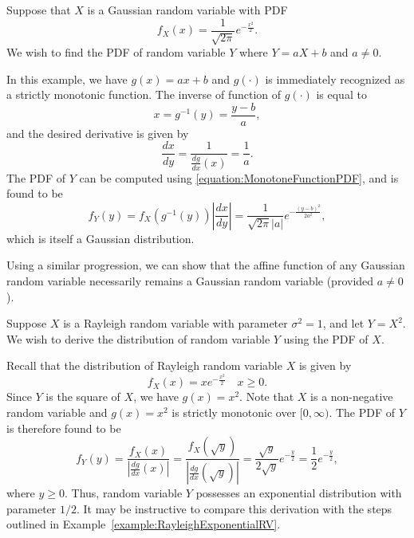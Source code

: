 \begin{example}
Suppose that $X$ is a Gaussian random variable with PDF
\begin{equation*}
f_X(x) = \frac{1}{\sqrt{2 \pi}} e^{- \frac{x^2}{2}} .
\end{equation*}
We wish to find the PDF of random variable $Y$ where $Y = a X + b$ and $a \neq 0$.

In this example, we have $g(x) = ax + b$ and $g(\cdot)$ is immediately recognized as a strictly monotonic function.
The inverse of function of $g(\cdot)$ is equal to
\begin{equation*}
x = g^{-1} (y) = \frac{y - b}{a} ,
\end{equation*}
and the desired derivative is given by
\begin{equation*}
\frac{dx}{dy} = \frac{1}{\frac{dg}{dx} (x)} = \frac{1}{a} .
\end{equation*}
The PDF of $Y$ can be computed using \eqref{equation:MonotoneFunctionPDF}, and is found to be
\begin{equation*}
f_Y(y) = f_X \left( g^{-1} (y) \right) \left| \frac{dx}{dy} \right|
= \frac{1}{\sqrt{2 \pi} |a|} e^{- \frac{(y-b)^2}{2 a^2} } ,
\end{equation*}
which is itself a Gaussian distribution.
\end{example}

Using a similar progression, we can show that the affine function of any Gaussian random variable necessarily remains a Gaussian random variable (provided $a \neq 0$).

\begin{example}
Suppose $X$ is a Rayleigh random variable with parameter $\sigma^2 = 1$, and let $Y = X^2$.
We wish to derive the distribution of random variable $Y$ using the PDF of $X$.

Recall that the distribution of Rayleigh random variable $X$ is given by
\begin{equation*}
f_X (x) = x e^{- \frac{x^2}{2} } \quad x \geq 0.
\end{equation*}
Since $Y$ is the square of $X$, we have $g(x) = x^2$.
Note that $X$ is a non-negative random variable and $g(x) = x^2$ is strictly monotonic over $[0, \infty)$.
The PDF of $Y$ is therefore found to be
\begin{equation*}
f_Y(y) = \frac{f_X (x)}{\left| \frac{dg}{dx}(x)\right|}
= \frac{f_X \left( \sqrt{y} \right)}{\left| \frac{dg}{dx} \left( \sqrt{y} \right) \right|}
= \frac{\sqrt{y}}{2 \sqrt{y}} e^{- \frac{y}{2} }
= \frac{1}{2} e^{- \frac{y}{2} } ,
\end{equation*}
where $y \geq 0$.
Thus, random variable $Y$ possesses an exponential distribution with parameter $1 / 2$.
It may be instructive to compare this derivation with the steps outlined in Example~\ref{example:RayleighExponentialRV}.
\end{example}

